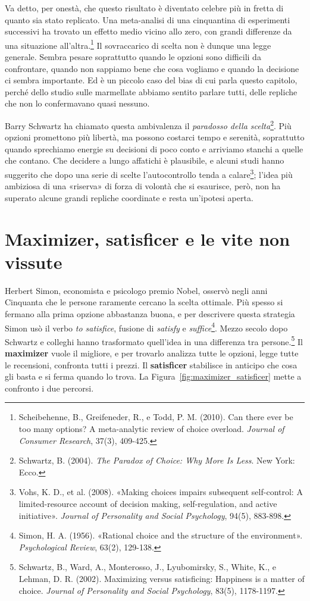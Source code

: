 Va detto, per onestà, che questo risultato è diventato celebre più in fretta di quanto sia stato replicato. Una meta-analisi di una cinquantina di esperimenti successivi ha trovato un effetto medio vicino allo zero, con grandi differenze da una situazione all'altra.\footnote{Scheibehenne, B., Greifeneder, R., e Todd, P. M. (2010). Can there ever be too many options? A meta-analytic review of choice overload. \textit{Journal of Consumer Research}, 37(3), 409-425.} Il sovraccarico di scelta non è dunque una legge generale. Sembra pesare soprattutto quando le opzioni sono difficili da confrontare, quando non sappiamo bene che cosa vogliamo e quando la decisione ci sembra importante. Ed è un piccolo caso del bias di cui parla questo capitolo, perché dello studio sulle marmellate abbiamo sentito parlare tutti, delle repliche che non lo confermavano quasi nessuno.

Barry Schwartz ha chiamato questa ambivalenza il \textit{paradosso della scelta}\footnote{Schwartz, B. (2004). \textit{The Paradox of Choice: Why More Is Less}. New York: Ecco.}. Più opzioni promettono più libertà, ma possono costarci tempo e serenità, soprattutto quando sprechiamo energie su decisioni di poco conto e arriviamo stanchi a quelle che contano. Che decidere a lungo affatichi è plausibile, e alcuni studi hanno suggerito che dopo una serie di scelte l'autocontrollo tenda a calare\footnote{Vohs, K. D., et al. (2008). «Making choices impairs subsequent self-control: A limited-resource account of decision making, self-regulation, and active initiative». \textit{Journal of Personality and Social Psychology}, 94(5), 883-898.}; l'idea più ambiziosa di una «riserva» di forza di volontà che si esaurisce, però, non ha superato alcune grandi repliche coordinate e resta un'ipotesi aperta.

\section{Maximizer, satisficer e le vite non vissute}
\label{sec:p2c30-fomo}

Herbert Simon, economista e psicologo premio Nobel, osservò negli anni Cinquanta che le persone raramente cercano la scelta ottimale. Più spesso si fermano alla prima opzione abbastanza buona, e per descrivere questa strategia Simon usò il verbo \textit{to satisfice}, fusione di \textit{satisfy} e \textit{suffice}\footnote{Simon, H. A. (1956). «Rational choice and the structure of the environment». \textit{Psychological Review}, 63(2), 129-138.}. Mezzo secolo dopo Schwartz e colleghi hanno trasformato quell'idea in una differenza tra persone.\footnote{Schwartz, B., Ward, A., Monterosso, J., Lyubomirsky, S., White, K., e Lehman, D. R. (2002). Maximizing versus satisficing: Happiness is a matter of choice. \textit{Journal of Personality and Social Psychology}, 83(5), 1178-1197.} Il \textbf{maximizer} vuole il migliore, e per trovarlo analizza tutte le opzioni, legge tutte le recensioni, confronta tutti i prezzi. Il \textbf{satisficer} stabilisce in anticipo che cosa gli basta e si ferma quando lo trova. La Figura~\ref{fig:maximizer_satisficer} mette a confronto i due percorsi.

